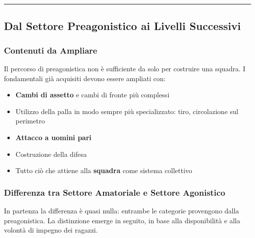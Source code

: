 \documentclass[a4paper,11pt]{article}
\providecommand{\tightlist}{%
  \setlength{\itemsep}{0pt}\setlength{\parskip}{0pt}}
\begin{document}
\begin{center}\rule{0.5\linewidth}{0.5pt}\end{center}

\subsection{Dal Settore Preagonistico ai Livelli
      Successivi}\label{dal-settore-preagonistico-ai-livelli-successivi}

\subsubsection{Contenuti da Ampliare}\label{contenuti-da-ampliare}

Il percorso di preagonistica non è sufficiente da solo per costruire una
squadra. I fondamentali già acquisiti devono essere ampliati con:

\begin{itemize}
      \tightlist
      \item
            \textbf{Cambi di assetto} e cambi di fronte più complessi
      \item
            Utilizzo della palla in modo sempre più specializzato: tiro,
            circolazione sul perimetro
      \item
            \textbf{Attacco a uomini pari}
      \item
            Costruzione della difesa
      \item
            Tutto ciò che attiene alla \textbf{squadra} come sistema collettivo
\end{itemize}

\subsubsection{Differenza tra Settore Amatoriale e Settore
      Agonistico}\label{differenza-tra-settore-amatoriale-e-settore-agonistico}

In partenza la differenza è quasi nulla: entrambe le categorie
provengono dalla preagonistica. La distinzione emerge in seguito, in
base alla disponibilità e alla volontà di impegno dei ragazzi.
\end{document}
